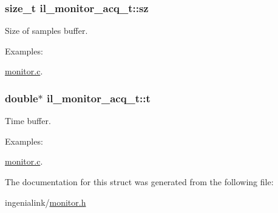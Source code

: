 \subsubsection[{\texorpdfstring{sz}{sz}}]{\setlength{\rightskip}{0pt plus 5cm}size\+\_\+t il\+\_\+monitor\+\_\+acq\+\_\+t\+::sz}\hypertarget{structil__monitor__acq__t_a1abcafb439ed9802b75afe08b5d48cea}{}\label{structil__monitor__acq__t_a1abcafb439ed9802b75afe08b5d48cea}


Size of samples buffer. 

\begin{Desc}
\item[Examples\+: ]\par
\hyperlink{monitor_8c-example}{monitor.\+c}.\end{Desc}
\subsubsection[{\texorpdfstring{t}{t}}]{\setlength{\rightskip}{0pt plus 5cm}double$\ast$ il\+\_\+monitor\+\_\+acq\+\_\+t\+::t}\hypertarget{structil__monitor__acq__t_a80f1fa100ff681ce19657ec1d91e0423}{}\label{structil__monitor__acq__t_a80f1fa100ff681ce19657ec1d91e0423}


Time buffer. 

\begin{Desc}
\item[Examples\+: ]\par
\hyperlink{monitor_8c-example}{monitor.\+c}.\end{Desc}


The documentation for this struct was generated from the following file\+:\begin{DoxyCompactItemize}
\item 
ingenialink/\hyperlink{monitor_8h}{monitor.\+h}\end{DoxyCompactItemize}
